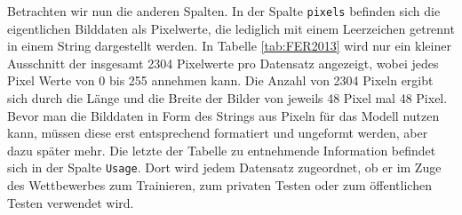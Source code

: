 \documentclass[12pt, a4paper]{scrbook}
\begin{document}
\begin{figure}[h]
\end{figure}
Betrachten wir nun die anderen Spalten. In der Spalte \texttt{pixels} befinden sich die eigentlichen Bilddaten als Pixelwerte, die lediglich mit einem Leerzeichen getrennt in einem String dargestellt werden. In Tabelle \ref{tab:FER2013} wird nur ein kleiner Ausschnitt der insgesamt 2304 Pixelwerte pro Datensatz angezeigt, wobei jedes Pixel Werte von 0 bis 255 annehmen kann. Die Anzahl von 2304 Pixeln ergibt sich durch die Länge und die Breite der Bilder von jeweils 48 Pixel mal 48 Pixel. Bevor man die Bilddaten in Form des Strings aus Pixeln für das Modell nutzen kann, müssen diese erst entsprechend formatiert und ungeformt werden, aber dazu später mehr.  
Die letzte der Tabelle zu entnehmende Information befindet sich in der Spalte \texttt{Usage}. Dort wird jedem Datensatz zugeordnet, ob er im Zuge des Wettbewerbes zum Trainieren, zum privaten Testen oder zum öffentlichen Testen verwendet wird.
\end{document}
